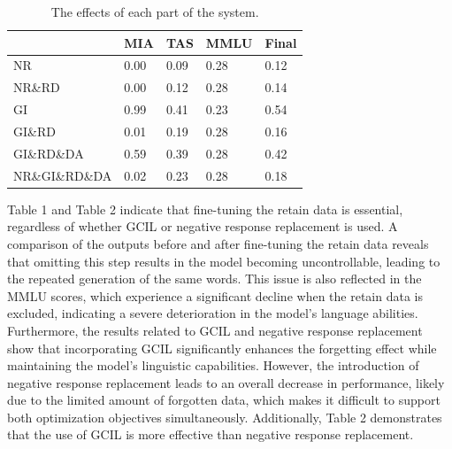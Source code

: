 \documentclass[11pt]{article}
\begin{document}
\begin{table}[h]\footnotesize
  \centering
    \begin{tabular}{l|l|l|l|l}
    \hline
        ~ & MIA & TAS & MMLU & Final \\ \hline
        NR & 0.00 & 0.09 & 0.28 & 0.12 \\ \hline
        NR\&RD & 0.00 & 0.12 & 0.28 & 0.14 \\ \hline
        GI & 0.99 & 0.41 & 0.23 & 0.54 \\ \hline
        GI\&RD & 0.01 & 0.19 & 0.28 & 0.16 \\ \hline
        GI\&RD\&DA & 0.59 & 0.39 & 0.28 & 0.42 \\ \hline
        NR\&GI\&RD\&DA & 0.02 & 0.23 & 0.28 & 0.18 \\ \hline
    \end{tabular}
  \caption{The effects of each part of the system.}
  \label{tab:accents}
\end{table}


Table 1 and Table 2 indicate that fine-tuning the retain data is essential, regardless of whether GCIL or negative response replacement is used. A comparison of the outputs before and after fine-tuning the retain data reveals that omitting this step results in the model becoming uncontrollable, leading to the repeated generation of the same words. This issue is also reflected in the MMLU scores, which experience a significant decline when the retain data is excluded, indicating a severe deterioration in the model's language abilities. Furthermore, the results related to GCIL and negative response replacement show that incorporating GCIL significantly enhances the forgetting effect while maintaining the model's linguistic capabilities. However, the introduction of negative response replacement leads to an overall decrease in performance, likely due to the limited amount of forgotten data, which makes it difficult to support both optimization objectives simultaneously. Additionally, Table 2 demonstrates that the use of GCIL is more effective than negative response replacement.
\end{document}
